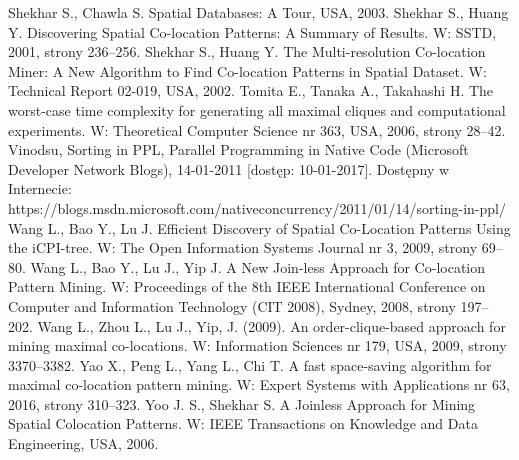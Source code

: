 \documentclass[12pt]{article}
\begin{document}
\begin{thebibliography}{}
Shekhar S., Chawla S. Spatial Databases: A Tour, USA, 2003.
Shekhar S., Huang Y. Discovering Spatial Co-location Patterns: A Summary of Results. W: SSTD, 2001, strony 236–256.
Shekhar S., Huang Y. The Multi-resolution Co-location Miner: A New Algorithm to Find Co-location Patterns in Spatial Dataset. W: Technical Report 02-019, USA, 2002.
Tomita E., Tanaka A., Takahashi H. The worst-case time complexity for generating all maximal cliques and computational experiments. W: Theoretical Computer Science nr 363, USA, 2006, strony 28–42.
Vinodsu, Sorting in PPL, Parallel Programming in Native Code (Microsoft Developer Network Blogs), 14-01-2011 [dostęp: 10-01-2017]. Dostępny w Internecie: https://blogs.msdn.microsoft.com/nativeconcurrency/2011/01/14/sorting-in-ppl/
Wang L., Bao Y., Lu J. Efficient Discovery of Spatial Co-Location Patterns Using the iCPI-tree. W: The Open Information Systems Journal nr 3, 2009, strony 69–80.
Wang L., Bao Y., Lu J., Yip J. A New Join-less Approach for Co-location Pattern Mining. W: Proceedings of the 8th IEEE International Conference on Computer and Information Technology (CIT 2008), Sydney, 2008, strony 197–202.
Wang L., Zhou L., Lu J., Yip, J. (2009). An order-clique-based approach for mining maximal co-locations. W: Information Sciences nr 179, USA, 2009, strony 3370–3382.
Yao X., Peng L., Yang L., Chi T. A fast space-saving algorithm for maximal co-location pattern mining. W: Expert Systems with Applications nr 63, 2016, strony 310–323.
Yoo J. S., Shekhar S. A Joinless Approach for Mining Spatial Colocation Patterns. W: IEEE Transactions on Knowledge and Data Engineering, USA, 2006.
\end{thebibliography}
\end{document}
